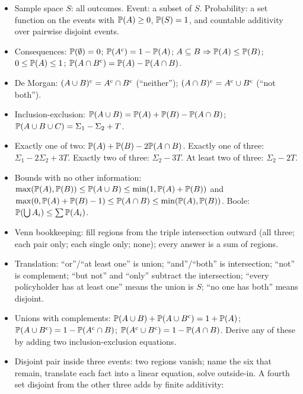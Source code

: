 \begin{itemize}[nosep]
  \item Sample space $S$: all outcomes. Event: a subset of $S$. Probability: a set
        function on the events with $\mathbb{P}(A) \ge 0$, $\mathbb{P}(S) = 1$, and countable
        additivity over pairwise disjoint events.
  \item Consequences: $\mathbb{P}(\emptyset) = 0$; $\mathbb{P}(A^{\mathrm{c}}) = 1 - \mathbb{P}(A)$;
        $A \subseteq B \Rightarrow \mathbb{P}(A) \le \mathbb{P}(B)$; $0 \le \mathbb{P}(A) \le 1$;
        $\mathbb{P}(A \cap B^{\mathrm{c}}) = \mathbb{P}(A) - \mathbb{P}(A \cap B)$.
  \item De Morgan: $(A \cup B)^{\mathrm{c}} = A^{\mathrm{c}} \cap B^{\mathrm{c}}$ (``neither'');
        $(A \cap B)^{\mathrm{c}} = A^{\mathrm{c}} \cup B^{\mathrm{c}}$ (``not both'').
  \item Inclusion-exclusion: $\mathbb{P}(A \cup B) = \mathbb{P}(A) + \mathbb{P}(B) - \mathbb{P}(A \cap B)$;
        $\mathbb{P}(A\cup B\cup C) = \Sigma_1 - \Sigma_2 + T$.
  \item Exactly one of two: $\mathbb{P}(A) + \mathbb{P}(B) - 2\mathbb{P}(A\cap B)$.
        Exactly one of three: $\Sigma_1 - 2\Sigma_2 + 3T$.
        Exactly two of three: $\Sigma_2 - 3T$. At least two of three: $\Sigma_2 - 2T$.
  \item Bounds with no other information: $\max(\mathbb{P}(A),\mathbb{P}(B)) \le \mathbb{P}(A \cup B) \le \min(1,\mathbb{P}(A)+\mathbb{P}(B))$
        and $\max(0, \mathbb{P}(A)+\mathbb{P}(B)-1) \le \mathbb{P}(A\cap B) \le \min(\mathbb{P}(A),\mathbb{P}(B))$.
        Boole: $\mathbb{P}(\bigcup A_i) \le \sum \mathbb{P}(A_i)$.
  \item Venn bookkeeping: fill regions from the triple intersection outward (all
        three; each pair only; each single only; none); every answer is a sum of regions.
  \item Translation: ``or''/``at least one'' is union; ``and''/``both'' is
        intersection; ``not'' is complement; ``but not'' and ``only'' subtract the
        intersection; ``every policyholder has at least one'' means the union is $S$;
        ``no one has both'' means disjoint.
  \item Unions with complements: $\mathbb{P}(A\cup B) + \mathbb{P}(A \cup B^{\mathrm{c}}) = 1 + \mathbb{P}(A)$;
        $\mathbb{P}(A \cup B^{\mathrm{c}}) = 1 - \mathbb{P}(A^{\mathrm{c}} \cap B)$; $\mathbb{P}(A^{\mathrm{c}}\cup B^{\mathrm{c}}) = 1 - \mathbb{P}(A \cap B)$.
        Derive any of these by adding two inclusion-exclusion equations.
  \item Disjoint pair inside three events: two regions vanish; name the six that
        remain, translate each fact into a linear equation, solve outside-in.
        A fourth set disjoint from the other three adds by finite additivity:

\end{itemize}
